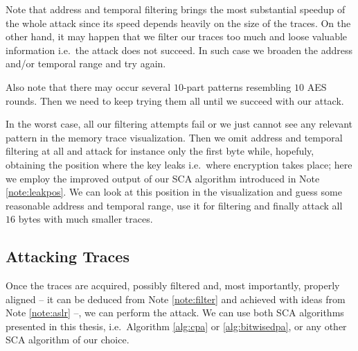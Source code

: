 		Note that address and temporal filtering brings the most substantial speedup of the whole attack since its speed depends heavily on the size of the traces. On the other hand, it may happen that we filter our traces too much and loose valuable information i.e.\ the attack does not succeed. In such case we broaden the address and/or temporal range and try again.
		
		Also note that there may occur several $10$-part patterns resembling $10$ AES rounds. Then we need to keep trying them all until we succeed with our attack.
		
		In the worst case, all our filtering attempts fail or we just cannot see any relevant pattern in the memory trace visualization. Then we omit address and temporal filtering at all and attack for instance only the first byte while, hopefuly, obtaining the position where the key leaks i.e.\ where encryption takes place; here we employ the improved output of our SCA algorithm introduced in Note \ref{note:leakpos}. We can look at this position in the visualization and guess some reasonable address and temporal range, use it for filtering and finally attack all $16$ bytes with much smaller traces.



\subsection{Attacking Traces}
\label{sec:attack}

Once the traces are acquired, possibly filtered and, most importantly, properly aligned -- it can be deduced from Note \ref{note:filter} and achieved with ideas from Note \ref{note:aslr} --, we can perform the attack. We can use both SCA algorithms presented in this thesis, i.e.\ Algorithm \ref{alg:cpa} or \ref{alg:bitwisedpa}, or any other SCA algorithm of our choice.

